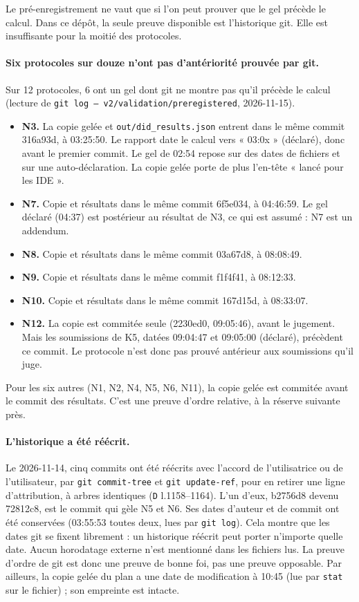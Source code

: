 Le pré-enregistrement ne vaut que si l'on peut prouver que le gel précède le calcul. Dans ce
dépôt, la seule preuve disponible est l'historique git. Elle est insuffisante pour la moitié des
protocoles.

\paragraph{Six protocoles sur douze n'ont pas d'antériorité prouvée par git.}
Sur 12\mesure{} protocoles, 6\mesure{} ont un gel dont git ne montre pas qu'il précède le calcul
(lecture de \texttt{git log -- v2/validation/preregistered}, 2026-11-15).
\begin{itemize}
  \item \textbf{N3.} La copie gelée et \texttt{out/did\_results.json} entrent dans le même commit
        316a93d, à 03:25:50\mesure. Le rapport date le calcul vers « 03:0x » (déclaré), donc avant
        le premier commit. Le gel de 02:54 repose sur des dates de fichiers et sur une
        auto-déclaration. La copie gelée porte de plus l'en-tête « lancé pour les IDE ».
  \item \textbf{N7.} Copie et résultats dans le même commit 6f5e034, à 04:46:59\mesure. Le gel
        déclaré (04:37) est postérieur au résultat de N3, ce qui est assumé : N7 est un addendum.
  \item \textbf{N8.} Copie et résultats dans le même commit 03a67d8, à 08:08:49\mesure.
  \item \textbf{N9.} Copie et résultats dans le même commit f1f4f41, à 08:12:33\mesure.
  \item \textbf{N10.} Copie et résultats dans le même commit 167d15d, à 08:33:07\mesure.
  \item \textbf{N12.} La copie est commitée seule (2230ed0, 09:05:46\mesure), avant le jugement.
        Mais les soumissions de K5, datées 09:04:47 et 09:05:00 (déclaré), précèdent ce commit. Le
        protocole n'est donc pas prouvé antérieur aux soumissions qu'il juge.
\end{itemize}
Pour les six autres (N1, N2, N4, N5, N6, N11), la copie gelée est commitée avant le commit des
résultats. C'est une preuve d'ordre relative, à la réserve suivante près.

\paragraph{L'historique a été réécrit.} Le 2026-11-14, cinq commits ont été réécrits avec
l'accord de l'utilisatrice ou de l'utilisateur, par \texttt{git commit-tree} et
\texttt{git update-ref}, pour en retirer une ligne d'attribution, à arbres identiques
(\texttt{D} l.1158--1164). L'un d'eux, b2756d8 devenu 72812c8, est le commit qui gèle N5 et N6.
Ses dates d'auteur et de commit ont été conservées (03:55:53\mesure{} toutes deux, lues par
\texttt{git log}). Cela montre que les dates git se fixent librement : un historique réécrit peut
porter n'importe quelle date. Aucun horodatage externe n'est mentionné dans les fichiers lus. La
preuve d'ordre de git est donc une preuve de bonne foi, pas une preuve opposable. Par ailleurs,
la copie gelée du plan a une date de modification à 10:45 (lue par \texttt{stat} sur le fichier) ; son empreinte
est intacte.

